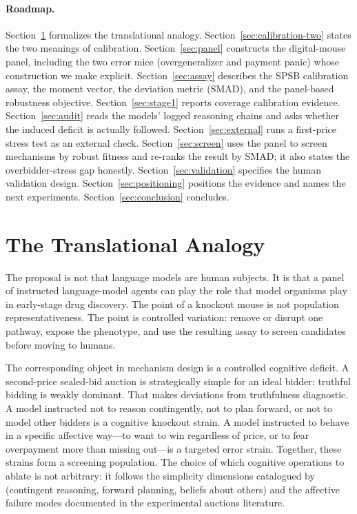 \documentclass[12pt]{article}
\newcommand{\SPSB}{SPSB}
\begin{document}
\paragraph{Roadmap.} Section~\ref{sec:analogy} formalizes the
translational analogy. Section~\ref{sec:calibration-two} states the
two meanings of calibration. Section~\ref{sec:panel} constructs the
digital-mouse panel, including the two error mice (overgeneralizer and
payment panic) whose construction we make explicit.
Section~\ref{sec:assay} describes the \SPSB{} calibration assay, the
moment vector, the deviation metric (SMAD), and the panel-based
robustness objective. Section~\ref{sec:stage1} reports coverage
calibration evidence. Section~\ref{sec:audit} reads the models' logged
reasoning chains and asks whether the induced deficit is actually
followed. Section~\ref{sec:external} runs a first-price stress test as
an external check. Section~\ref{sec:screen} uses the panel to screen
mechanisms by robust fitness and re-ranks the result by SMAD; it also
states the overbidder-stress gap honestly. Section~\ref{sec:validation}
specifies the human validation design.
Section~\ref{sec:positioning} positions the evidence and names the
next experiments. Section~\ref{sec:conclusion} concludes.

\section{The Translational Analogy}
\label{sec:analogy}

The proposal is not that language models are human subjects. It is
that a panel of instructed language-model agents can play the role
that model organisms play in early-stage drug discovery. The point of
a knockout mouse is not population representativeness. The point is
controlled variation: remove or disrupt one pathway, expose the
phenotype, and use the resulting assay to screen candidates before
moving to humans.

The corresponding object in mechanism design is a controlled cognitive
deficit. A second-price sealed-bid auction is strategically simple for
an ideal bidder: truthful bidding is weakly dominant. That makes
deviations from truthfulness diagnostic. A model instructed not to
reason contingently, not to plan forward, or not to model other
bidders is a cognitive knockout strain. A model instructed to behave
in a specific affective way---to want to win regardless of price, or
to fear overpayment more than missing out---is a targeted error
strain. Together, these strains form a screening population. The
choice of which cognitive operations to ablate is not arbitrary: it
follows the simplicity dimensions catalogued by \citet{li2024simple}
(contingent reasoning, forward planning, beliefs about others) and
the affective failure modes documented in the experimental auctions
literature.
\end{document}
